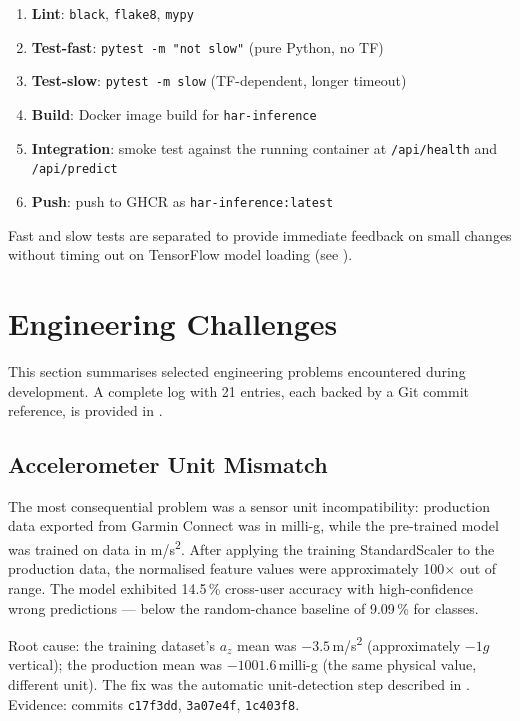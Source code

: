 \begin{enumerate}
  \item \textbf{Lint}: \texttt{black}, \texttt{flake8}, \texttt{mypy}
  \item \textbf{Test-fast}: \texttt{pytest -m "not slow"} (pure Python, no TF)
  \item \textbf{Test-slow}: \texttt{pytest -m slow} (TF-dependent, longer timeout)
  \item \textbf{Build}: Docker image build for \texttt{har-inference}
  \item \textbf{Integration}: smoke test against the running container
          at \texttt{/api/health} and \texttt{/api/predict}
  \item \textbf{Push}: push to GHCR as \texttt{har-inference:latest}
\end{enumerate}

Fast and slow tests are separated to provide immediate feedback on small changes
without timing out on TensorFlow model loading (see ).

\section{Engineering Challenges}
\label{sec:engineering_challenges}

This section summarises selected engineering problems encountered during
development.
A complete log with 21 entries, each backed by a Git commit reference, is
provided in .

\subsection{Accelerometer Unit Mismatch}
\label{sec:unit_mismatch}

The most consequential problem was a sensor unit incompatibility:
production data exported from Garmin Connect was in milli-g, while the
pre-trained model was trained on data in m/s\textsuperscript{2}.
After applying the training StandardScaler to the production data, the
normalised feature values were approximately 100$\times$ out of range.
The model exhibited 14.5\,\% cross-user accuracy with high-confidence
wrong predictions --- below the random-chance baseline of 9.09\,\% for
\nclasses{} classes.

Root cause: the training dataset's $a_z$ mean was $-3.5$\,m/s\textsuperscript{2}
(approximately $-1g$ vertical); the production mean was $-1001.6$\,milli-g
(the same physical value, different unit).
The fix was the automatic unit-detection step described in .
Evidence: commits \texttt{c17f3dd}, \texttt{3a07e4f}, \texttt{1c403f8}.

